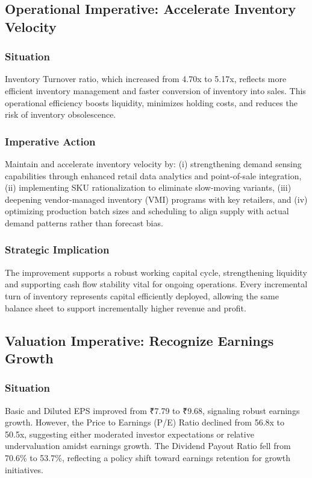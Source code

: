 \documentclass[12pt, a4paper]{report}
\begin{document}
\subsection{Operational Imperative: Accelerate Inventory Velocity}

\subsubsection{Situation}
Inventory Turnover ratio, which increased from 4.70x to 5.17x, reflects more efficient inventory management and faster conversion of inventory into sales. This operational efficiency boosts liquidity, minimizes holding costs, and reduces the risk of inventory obsolescence.

\subsubsection{Imperative Action}
Maintain and accelerate inventory velocity by: (i) strengthening demand sensing capabilities through enhanced retail data analytics and point-of-sale integration, (ii) implementing SKU rationalization to eliminate slow-moving variants, (iii) deepening vendor-managed inventory (VMI) programs with key retailers, and (iv) optimizing production batch sizes and scheduling to align supply with actual demand patterns rather than forecast bias.

\subsubsection{Strategic Implication}
The improvement supports a robust working capital cycle, strengthening liquidity and supporting cash flow stability vital for ongoing operations. Every incremental turn of inventory represents capital efficiently deployed, allowing the same balance sheet to support incrementally higher revenue and profit.

\subsection{Valuation Imperative: Recognize Earnings Growth}

\subsubsection{Situation}
Basic and Diluted EPS improved from ₹7.79 to ₹9.68, signaling robust earnings growth. However, the Price to Earnings (P/E) Ratio declined from 56.8x to 50.5x, suggesting either moderated investor expectations or relative undervaluation amidst earnings growth. The Dividend Payout Ratio fell from 70.6\% to 53.7\%, reflecting a policy shift toward earnings retention for growth initiatives.
\end{document}
